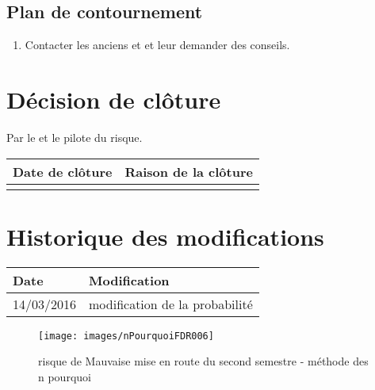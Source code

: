 \flushleft
\subsection*{Plan de contournement}

\begin{enumerate}
	\item Contacter les anciens \CP{} et \RQ{} et leur demander des conseils.
\end{enumerate}

\section*{Décision de clôture}
Par le \CP{} et le pilote du risque.
\begin{table}[H]
\centering
	\begin{tabularx}{16.8cm}{|X|X|}
	\hline
	\rowcolor{gray!40} Date de clôture & Raison de la clôture \\
	\hline
	  & \\
	\hline
	\end{tabularx}
\end{table}

\section*{Historique des modifications}
\begin{table}[H]
\centering
	\begin{tabularx}{16.8cm}{|X|X|}
	\hline
	Date & Modification \\
	\hline
	 14/03/2016 & modification de la probabilité \\
	\hline
	\end{tabularx}
\end{table}
\newpage

\begin{landscape}
\begin{figure}
	\centering
	\texttt{[image: images/nPourquoiFDR006]}
	\caption{\label{risque Mauvaise mise en route du second semestre}risque de Mauvaise mise en route du second semestre - méthode des n pourquoi}
\end{figure}
\end{landscape}